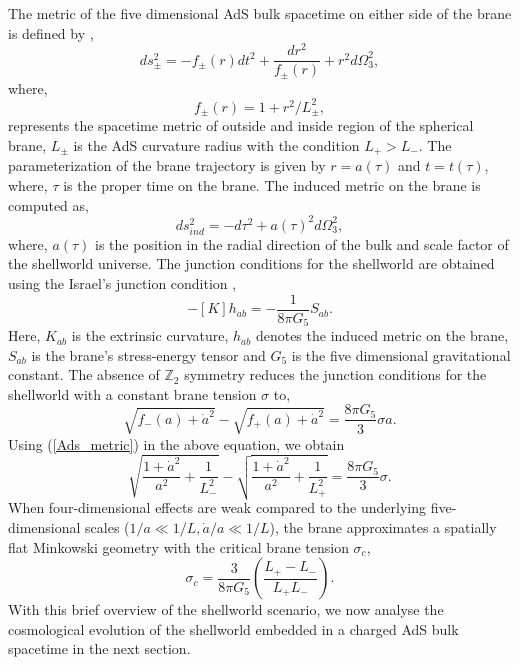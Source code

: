 \documentclass[12pt]{article}
\begin{document}
The metric of the five dimensional AdS bulk spacetime on either side of the brane is defined by \cite{Banerjee:2019fzz},
\begin{equation}\label{bulk_metric}
	ds^2_{\pm}=-f_{\pm}(r)dt^2+\frac{dr^2}{f_{\pm}(r)}+r^2 d\Omega_3^2,
\end{equation}
where, 
\begin{equation}\label{Ads_metric}
f_{\pm}(r) = 1 + r^2/L_{\pm}^2,
\end{equation}
represents the spacetime metric of outside and inside region of the spherical brane, $L_\pm$ is the AdS curvature radius with the condition $L_+ > L_-$.
The parameterization of the brane trajectory is given by $r=a(\tau)$ and $t=t(\tau)$, where, $\tau$ is the proper time on the brane. The induced metric on the brane is computed as,
\begin{equation}
    ds^2_{ind}=-d\tau^2+a(\tau)^2 d\Omega_3^2,
\end{equation}
where, $a(\tau)$ is the position in the radial direction of the bulk and scale factor of the shellworld universe. The junction conditions for the shellworld are obtained using the Israel's junction condition \cite{Israel:1966rt},
\begin{equation}
	[K_{ab}]-[K] h_{ab}=-\frac{1}{8\pi G_5} S_{ab}.
\end{equation}
Here, $K_{ab}$ is the extrinsic curvature, $h_{ab}$ denotes the induced metric on the brane, $S_{ab}$ is the brane's stress-energy tensor and $G_5$ is the five dimensional gravitational constant. The absence of $\mathbb{Z}_2$ symmetry reduces the junction conditions for the shellworld with a constant brane tension $\sigma$ to,
\begin{equation}\label{bubble_JC}
\sqrt{f_-(a)+\dot{a}^2}-\sqrt{f_+(a)+\dot{a}^2}=\frac{8 \pi G_5}{3}\sigma a.
\end{equation}
Using (\ref{Ads_metric}) in the above equation, we obtain
\begin{equation}
\sqrt{\frac{1+\dot{a}^2}{a^2}+\frac{1}{L_-^2}}-\sqrt{\frac{1+\dot{a}^2}{a^2}+\frac{1}{L_+^2}}=\frac{8 \pi G_5}{3}\sigma .
\end{equation}
 When four-dimensional effects are weak compared to the underlying five-dimensional scales ($1/a\ll1/L, \dot{a}/a\ll1/L$), the brane approximates a spatially flat Minkowski geometry with the critical brane tension $\sigma_c$,
 \begin{equation}
 \sigma_c=\frac{3}{8\pi G_5}\left(\frac{L_+-L_-}{L_+L_-} \right).
 \end{equation}
 With this brief overview of the shellworld scenario, we now analyse the cosmological evolution of the shellworld embedded in a charged AdS bulk spacetime in the next section.
\end{document}
